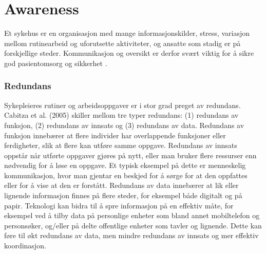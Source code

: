 \section{Awareness}
\label{chp: awareness}

Et sykehus er en organisasjon med mange informasjonskilder, stress, variasjon mellom rutinearbeid og uforutsette aktiviteter, og ansatte som stadig er på forskjellige steder. Kommunikasjon og oversikt er derfor svært viktig for å sikre god pasientomsorg og sikkerhet \cite{Klemets12}.

\subsubsection{Redundans}
Sykepleieres rutiner og arbeidsoppgaver er i stor grad preget av redundans. Cabitza et al. (2005) skiller mellom tre typer redundans: (1) redundans av funksjon, (2) redundans av innsats og (3) redundans av data. Redundans av funksjon innebærer at flere individer har overlappende funksjoner eller ferdigheter, slik at flere kan utføre samme oppgave. Redundans av innsats oppstår når utførte oppgaver gjøres på nytt, eller man bruker flere ressurser enn nødvendig for å løse en oppgave. Et typisk eksempel på dette er menneskelig kommunikasjon, hvor man gjentar en beskjed for å sørge for at den oppfattes eller for å vise at den er forstått. Redundans av data innebærer at lik eller lignende informasjon finnes på flere steder, for eksempel både digitalt og på papir. Teknologi kan bidra til å spre informasjon på en effektiv måte, for eksempel ved å tilby data på personlige enheter som bland annet mobiltelefon og personsøker, og/eller på delte offentlige enheter som tavler og lignende. Dette kan føre til økt redundans av data, men mindre redundans av innsats og mer effektiv koordinasjon.

